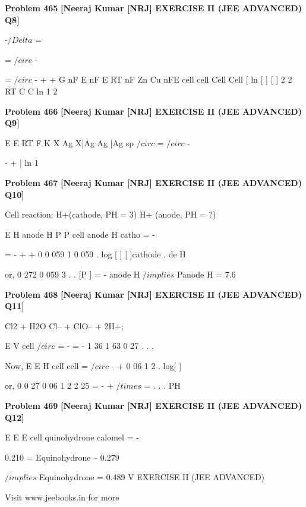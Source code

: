 \begin{problembox}
\textbf{Problem 465} \hfill \textbf{[Neeraj Kumar [NRJ] EXERCISE II (JEE ADVANCED) Q8]}
\label{q:ext-nrj_all_questions-465}

-$/Delta$
=
 
=
$/circ$
-
 
=
$/circ$
-
+
+
G
nF E
nF E
RT
nF
Zn
Cu
nFE
cell
cell
Cell
Cell
[
ln [
]
[
]
2
2
RT
C
C
 ln
1
2
\end{problembox}

\begin{problembox}
\textbf{Problem 466} \hfill \textbf{[Neeraj Kumar [NRJ] EXERCISE II (JEE ADVANCED) Q9]}
\label{q:ext-nrj_all_questions-466}

E
E
RT
F
K
X
Ag X|Ag
Ag |Ag
sp
$/circ$
=
$/circ$
-
 
-
+
|
ln 1
\end{problembox}

\begin{problembox}
\textbf{Problem 467} \hfill \textbf{[Neeraj Kumar [NRJ] EXERCISE II (JEE ADVANCED) Q10]}
\label{q:ext-nrj_all_questions-467}

Cell reaction: H+(cathode, PH = 3) 
 H+ 
(anode, PH = ?)
 
 
E
H
anode
H
P
P
cell
anode
H
catho
=
-
 
=
-
+
+
0
0 059
1
0 059
.
log [
]
[
]cathode
.
de
H
  
  
 
 or, 0 272
0 059
3
.
.
[P
]
=
-
anode
H
 $/implies$ Panode
H
 = 7.6
\end{problembox}

\begin{problembox}
\textbf{Problem 468} \hfill \textbf{[Neeraj Kumar [NRJ] EXERCISE II (JEE ADVANCED) Q11]}
\label{q:ext-nrj_all_questions-468}

Cl2 + H2O   Cl-- + ClO-- + 2H+; 
 
 
E
V
cell
$/circ$
=
-
= -
1 36
1 63
0 27
.
.
.
 
 Now, E
E
H
cell
cell
=
$/circ$
-
+
0 06
1
2
.
log[
]
 
 or, 0
0 27
0 06
1
2
2 25
= -
+
$/times$
=
.
.
.
PH
\end{problembox}

\begin{problembox}
\textbf{Problem 469} \hfill \textbf{[Neeraj Kumar [NRJ] EXERCISE II (JEE ADVANCED) Q12]}
\label{q:ext-nrj_all_questions-469}

E
E
E
cell
quinohydrone
calomel
=
-
 
 0.210 = Equinohydrone -- 0.279 
 
 $/implies$ Equinohydrone = 0.489 V
EXERCISE II (JEE ADVANCED)
 
 
Visit www.jeebooks.in for more
\end{problembox}

